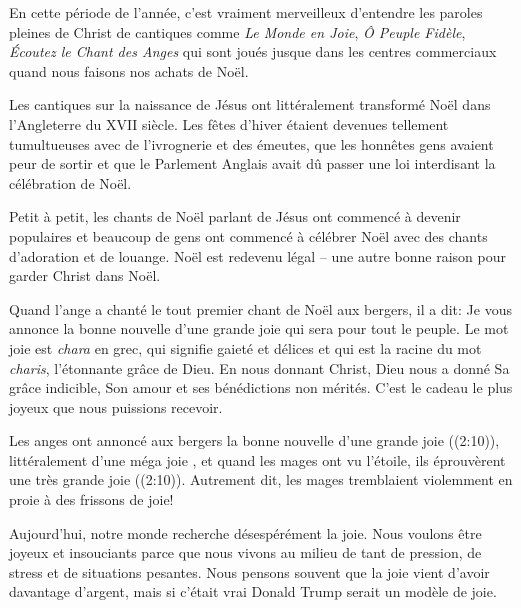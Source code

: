 


En cette période de l'année, c'est vraiment merveilleux d'entendre les paroles \og pleines de Christ \fg{} de cantiques comme \emph{Le Monde en Joie}, \emph{Ô Peuple Fidèle}, \emph{Écoutez le Chant des Anges} qui sont joués jusque dans les centres commerciaux quand nous faisons nos achats de Noël.

Les cantiques sur la naissance de Jésus ont littéralement transformé Noël dans l'Angleterre du XVII siècle. Les fêtes d'hiver étaient devenues tellement tumultueuses avec de l'ivrognerie et des émeutes, que les honnêtes gens avaient peur de sortir et que le Parlement Anglais avait dû passer une loi interdisant la célébration de Noël.

Petit à petit, les chants de Noël parlant de Jésus ont commencé à devenir populaires et beaucoup de gens ont commencé à célébrer Noël avec des chants d'adoration et de louange. Noël est redevenu légal – une autre bonne raison pour garder Christ dans Noël.

Quand l'ange a chanté le tout premier chant de Noël aux bergers, il a dit: \og Je vous annonce la bonne nouvelle d’une grande joie qui sera pour tout le peuple. \fg{} Le mot \og joie \fg{} est \emph{chara} en grec, qui signifie \og gaieté et délices \fg{} et qui est la racine du mot \emph{charis}, l'étonnante grâce de Dieu. En nous donnant Christ, Dieu nous a donné Sa grâce indicible, Son amour et ses bénédictions non mérités. C'est le cadeau le plus joyeux que nous puissions recevoir.

Les anges ont annoncé aux bergers la \og bonne nouvelle d'une grande joie \fg{} ((2:10)), littéralement d'une \og méga joie \fg{}, et quand les mages ont vu l'étoile, \og ils éprouvèrent une très grande joie \fg{} ((2:10)). Autrement dit, les mages \og tremblaient violemment en proie à des frissons de joie! \fg{}

Aujourd'hui, notre monde recherche désespérément la joie. Nous voulons être joyeux et insouciants parce que nous vivons au milieu de tant de pression, de stress et de situations pesantes. Nous pensons souvent que la joie vient d'avoir davantage d'argent, mais si c'était vrai Donald Trump serait un modèle de joie.

